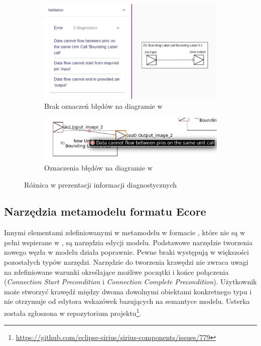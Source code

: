 \begin{figure}
	\centering
	\begin{subfigure}{.49\textwidth}
		\centering
		\includegraphics[width=.99\linewidth]{./images/sirius-web-semantic-validation-direction-and-no-loops-rules.png}
		\caption{Brak oznaczeń błędów na diagramie w \SiriusWeb{}}\label{rys:validation-comparison-sirius-web}
	\end{subfigure}
  \begin{subfigure}{.49\textwidth}
		\centering
		\includegraphics[width=.99\linewidth]{./images/sirius-desktop-example-semantic-validation-rule-failure.png}
		\caption{Oznaczenia błędów na diagramie w \SiriusDesktop{}}\label{rys:validation-comparison-sirius-desktop}
	\end{subfigure}

	\caption{Różnica w prezentacji informacji diagnostycznych}
\end{figure}

\subsection{Narzędzia metamodelu formatu Ecore}

Innymi elementami zdefiniowanymi w metamodelu w formacie \Ecore{}, które nie są
w pełni
wspierane w \SiriusWeb{}, są narzędzia edycji modelu. Podstawowe narzędzie
tworzenia nowego węzła w modelu działa poprawnie.
Pewne braki występują w większości pozostałych typów narzędzi. Narzędzie do
tworzenia krawędzi nie zwraca uwagi na zdefiniowane warunki określające możliwe
początki i końce połączenia (\emph{Connection Start Precondition} i
\emph{Connection Complete Precondition}). Użytkownik może stworzyć krawędź
między dwoma dowolnymi obiektami konkretnego typu i nie otrzymuje od edytora
wskazówek bazujących na semantyce modelu. Usterka została zgłoszona w
repozytorium projektu\footnote{
	\url{https://github.com/eclipse-sirius/sirius-components/issues/779}}.

